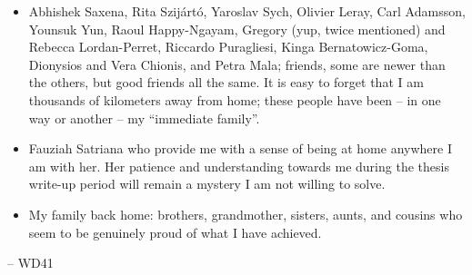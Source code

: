 \begin{itemize}
	\item Abhishek Saxena, Rita Szijártó, Yaroslav Sych, Olivier Leray, Carl Adamsson, Younsuk Yun, Raoul Happy-Ngayam, Gregory (yup, twice mentioned) and Rebecca Lordan-Perret, Riccardo Puragliesi, Kinga Bernatowicz-Goma, Dionysios and Vera Chionis, and Petra Mala; friends, some are newer than the others, but good friends all the same. It is easy to forget that I am thousands of kilometers away from home; these people have been -- in one way or another -- my ``immediate family''.
  \item Fauziah Satriana who provide me with a sense of being at home anywhere I am with her. Her patience and understanding towards me during the thesis write-up period will remain a mystery I am not willing to solve.
  \item My family back home: brothers, grandmother, sisters, aunts, and cousins who seem to be genuinely proud of what I have achieved.
\end{itemize}

\bigskip
\hspace*{0mm}-- WD41

